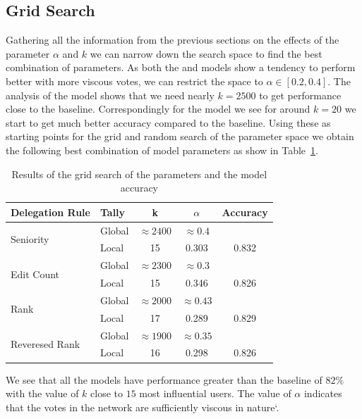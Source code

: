 \subsection{Grid Search}
Gathering all the information from the previous sections on the effects of the parameter $\alpha$ and $k$ we can narrow down the search space to find the best combination of parameters. As both the \localv and \globalv models show a tendency to perform better with more viscous votes, we can restrict the space to $\alpha \in [0.2,0.4]$. The analysis of the \globalv model shows that we need nearly $k=2500$ to get performance close to the baseline. Correspondingly for the \localv model we see for around $k=20$ we start to get much better accuracy compared to the baseline. Using these as starting points for the grid and random search of the parameter space we obtain the following best combination of model parameters as show in Table~\ref{tab:grid-search}.
\begin{table}
    \centering
    \caption{Results of the grid search of the parameters and the model accuracy}
    \label{tab:grid-search}
    \begin{tabular}{llccc}
        \toprule
        Delegation Rule & Tally & k & $\alpha$ & Accuracy \\ \midrule
        \multirow{2}{*}{Seniority} & Global & $\approx 2400$ & $\approx 0.4$ &   \\ 
        \cmidrule{2-5}
        & Local & 15 & 0.303& 0.832  \\
        \midrule
        \multirow{2}{*}{Edit Count} & Global & $\approx 2300$ & $\approx 0.3$ & \\
        \cmidrule{2-5}
        & Local & 15 & 0.346 & 0.826 \\
        \midrule
        \multirow{2}{*}{Rank} & Global & $\approx 2000$ & $\approx 0.43$  \\
        \cmidrule{2-5}
        & Local & 17 & 0.289 & 0.829  \\
        \midrule
        \multirow{2}{*}{Reveresed Rank} & Global & $\approx 1900$ & $\approx 0.35$  \\
        \cmidrule{2-5}
        & Local & 16 & 0.298 & 0.826  \\
        \bottomrule
        \end{tabular}
\end{table}

We see that all the \localv models have performance greater than the baseline of $82\%$ with the value of $k$ close to $15$ most influential users. The value of $\alpha$ indicates that the votes in the network are sufficiently viscous in nature`. 